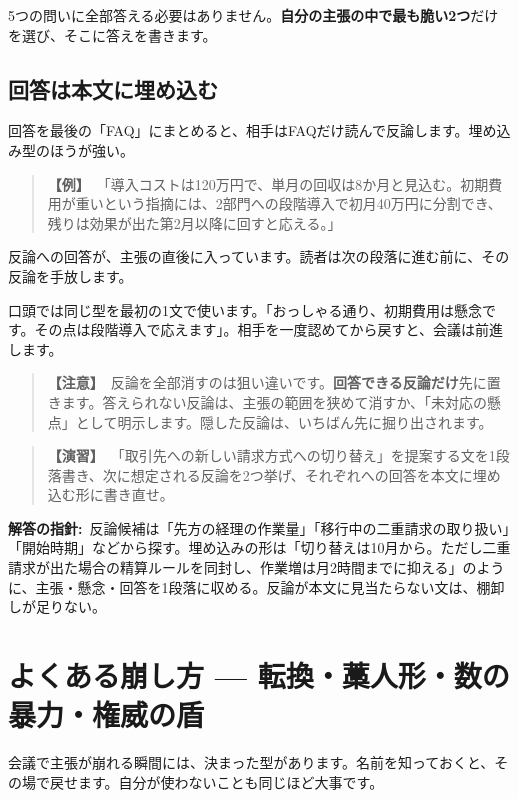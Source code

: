 \documentclass{article}
\begin{document}
5つの問いに全部答える必要はありません。\textbf{自分の主張の中で最も脆い2つ}だけを選び、そこに答えを書きます。

\subsection{回答は本文に埋め込む}

回答を最後の「FAQ」にまとめると、相手はFAQだけ読んで反論します。埋め込み型のほうが強い。

\begin{quote}
\textbf{【例】}\ 「導入コストは120万円で、単月の回収は8か月と見込む。初期費用が重いという指摘には、2部門への段階導入で初月40万円に分割でき、残りは効果が出た第2月以降に回すと応える。」
\end{quote}

反論への回答が、主張の直後に入っています。読者は次の段落に進む前に、その反論を手放します。

口頭では同じ型を最初の1文で使います。「おっしゃる通り、初期費用は懸念です。その点は段階導入で応えます」。相手を一度認めてから戻すと、会議は前進します。

\begin{quote}
\textbf{【注意】}\ 反論を全部消すのは狙い違いです。\textbf{回答できる反論だけ}先に置きます。答えられない反論は、主張の範囲を狭めて消すか、「未対応の懸点」として明示します。隠した反論は、いちばん先に掘り出されます。
\end{quote}

\begin{quote}
\textbf{【演習】}\ 「取引先への新しい請求方式への切り替え」を提案する文を1段落書き、次に想定される反論を2つ挙げ、それぞれへの回答を本文に埋め込む形に書き直せ。
\end{quote}

\textbf{解答の指針:}\ 反論候補は「先方の経理の作業量」「移行中の二重請求の取り扱い」「開始時期」などから探す。埋め込みの形は「切り替えは10月から。ただし二重請求が出た場合の精算ルールを同封し、作業増は月2時間までに抑える」のように、主張・懸念・回答を1段落に収める。反論が本文に見当たらない文は、棚卸しが足りない。

\section{よくある崩し方 — 転換・藁人形・数の暴力・権威の盾}

会議で主張が崩れる瞬間には、決まった型があります。名前を知っておくと、その場で戻せます。自分が使わないことも同じほど大事です。
\end{document}
